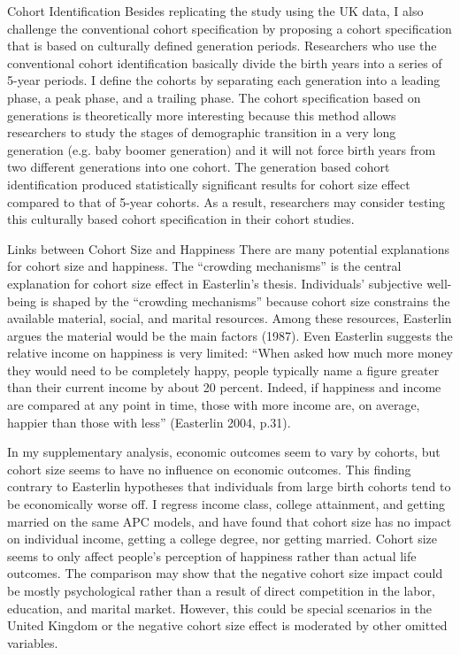Cohort Identification
Besides replicating the study using the UK data, I also challenge the conventional cohort specification by proposing a cohort specification that is based on culturally defined generation periods. Researchers who use the conventional cohort identification basically divide the birth years into a series of 5-year periods. I define the cohorts by separating each generation into a leading phase, a peak phase, and a trailing phase. The cohort specification based on generations is theoretically more interesting because this method allows researchers to study the stages of demographic transition in a very long generation (e.g. baby boomer generation) and it will not force birth years from two different generations into one cohort. The generation based cohort identification produced statistically significant results for cohort size effect compared to that of 5-year cohorts. As a result, researchers may consider testing this culturally based cohort specification in their cohort studies.

Links between Cohort Size and Happiness
There are many potential explanations for cohort size and happiness. The “crowding mechanisms” is the central explanation for cohort size effect in Easterlin’s thesis. Individuals’ subjective well-being is shaped by the “crowding mechanisms” because cohort size constrains the available material, social, and marital resources. Among these resources, Easterlin argues the material would be the main factors (1987). Even Easterlin suggests the relative income on happiness is very limited: “When asked how much more money they would need to be completely happy, people typically name a figure greater than their current income by about 20 percent. Indeed, if happiness and income are compared at any point in time, those with more income are, on average, happier than those with less” (Easterlin 2004, p.31).

In my supplementary analysis, economic outcomes seem to vary by cohorts, but cohort size seems to have no influence on economic outcomes. This finding contrary to Easterlin hypotheses that individuals from large birth cohorts tend to be economically worse off. I regress income class, college attainment, and getting married on the same APC models, and have found that cohort size has no impact on individual income, getting a college degree, nor getting married. Cohort size seems to only affect people’s perception of happiness rather than actual life outcomes. The comparison may show that the negative cohort size impact could be mostly psychological rather than a result of direct competition in the labor, education, and marital market. However, this could be special scenarios in the United Kingdom or the negative cohort size effect is moderated by other omitted variables.

